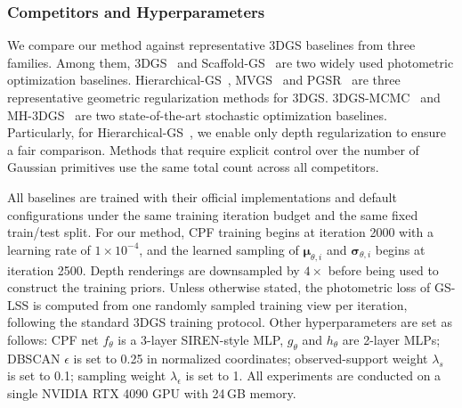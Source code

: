 \documentclass[lettersize,journal]{IEEEtran}
\begin{document}
\subsubsection{Competitors and Hyperparameters}

We compare our method against representative 3DGS baselines from three families. 
Among them, 3DGS~\cite{3dgs} and Scaffold-GS~\cite{scaffold} are two widely used photometric optimization baselines.
Hierarchical-GS~\cite{hierarchical}, MVGS~\cite{mvgs} and PGSR~\cite{pgsr} are three representative geometric regularization methods for 3DGS.
3DGS-MCMC~\cite{mcmc} and MH-3DGS~\cite{mh3dgs} are two state-of-the-art stochastic optimization baselines.
Particularly, for Hierarchical-GS~\cite{hierarchical}, we enable only depth regularization to ensure a fair comparison.
Methods that require explicit control over the number of Gaussian primitives use the same total count across all competitors. 

All baselines are trained with their official implementations and default configurations under the same training iteration budget and the same fixed train/test split. 
For our method, CPF training begins at iteration 2000 with a learning rate of $1\times10^{-4}$, 
and the learned sampling of $\boldsymbol{\mu}_{\theta,i}$ and $\boldsymbol{\sigma}_{\theta,i}$ begins at iteration 2500.
Depth renderings are downsampled by $4\times$ before being used to construct the training priors.
Unless otherwise stated, the photometric loss of GS-LSS is computed from one randomly sampled training view per iteration, following the standard 3DGS training protocol.
Other hyperparameters are set as follows: CPF net $f_{\theta}$ is a 3-layer SIREN-style MLP, $g_{\theta}$ and $h_{\theta}$ are 2-layer MLPs; DBSCAN $\epsilon$ is set to 0.25 in normalized coordinates; observed-support weight $\lambda_s$ is set to 0.1; sampling weight $\lambda_{\epsilon}$ is set to 1.
All experiments are conducted on a single NVIDIA RTX 4090 GPU with 24\,GB memory.

\end{document}
